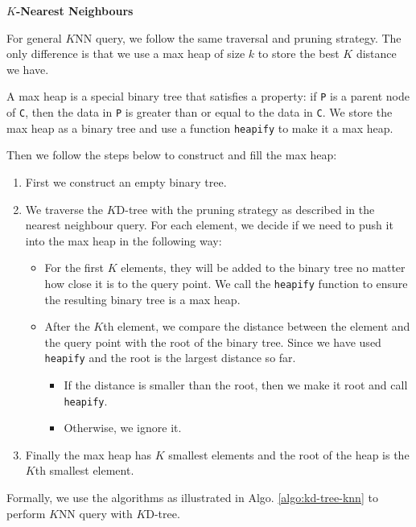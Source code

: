 \noindent
\textbf{$K$-Nearest Neighbours}

For general $K$NN query, we follow the same traversal and pruning strategy. The only difference is that we use a max heap of size $k$ to store the best $K$ distance we have.

A max heap is a special binary tree that satisfies a property: if \texttt{P} is a parent node of \texttt{C}, then the data in \texttt{P} is greater than or equal to the data in \texttt{C}. We store the max heap as a binary tree and use a function \texttt{heapify} to make it a max heap.

Then we follow the steps below to construct and fill the max heap:

\begin{enumerate}
	\item First we construct an empty binary tree. 
	\item We traverse the $K$D-tree with the pruning strategy as described in the nearest neighbour query. For each element, we decide if we need to push it into the max heap in the following way:
	\begin{itemize}
		\item For the first $K$ elements, they will be added to the binary tree no matter how close it is to the query point. We call the \texttt{heapify} function to ensure the resulting binary tree is a max heap.
		\item After the $K$th element, we compare the distance between the element and the query point with the root of the binary tree. Since we have used \texttt{heapify} and the root is the largest distance so far.
		\begin{itemize}
			\item If the distance is smaller than the root, then we make it root and call \texttt{heapify}.
			\item Otherwise, we ignore it.
		\end{itemize}
	\end{itemize}
	\item Finally the max heap has $K$ smallest elements and the root of the heap is the $K$th smallest element.
\end{enumerate}

Formally, we use the algorithms as illustrated in Algo. \ref{algo:kd-tree-knn} to perform $K$NN query with $K$D-tree.


